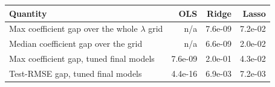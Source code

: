 \begin{tabular}{@{}lrrr@{}}
\toprule
Quantity & OLS & Ridge & Lasso \\
\midrule
Max coefficient gap over the whole $\lambda$ grid & n/a & 7.6e-09 & 7.2e-02 \\
Median coefficient gap over the grid & n/a & 6.6e-09 & 2.0e-02 \\
Max coefficient gap, tuned final models & 7.6e-09 & 2.0e-01 & 4.3e-02 \\
Test-RMSE gap, tuned final models & 4.4e-16 & 6.9e-03 & 7.2e-03 \\
\bottomrule
\end{tabular}